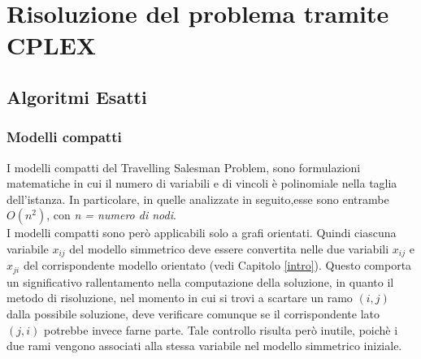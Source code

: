 \chapter{Risoluzione del problema tramite CPLEX}\label{CPLEX} 
\section{Algoritmi Esatti}
\subsection{Modelli compatti}
I modelli compatti del Travelling Salesman Problem, sono formulazioni matematiche in cui il numero di variabili e di vincoli è polinomiale nella taglia dell'istanza. In particolare, in quelle analizzate in seguito,esse sono entrambe $O(n^2)$, con \textit{n = numero di nodi}.\\
I modelli compatti sono però applicabili solo a grafi orientati. Quindi ciascuna variabile $x_{ij}$ del modello simmetrico deve essere convertita nelle due variabili $x_{ij}$ e $x_{ji}$ del corrispondente modello orientato (vedi Capitolo \ref{intro}). Questo comporta un significativo rallentamento nella computazione della soluzione, in quanto il metodo di risoluzione, nel momento in cui si trovi a scartare un ramo $(i,j)$ dalla possibile soluzione, deve verificare comunque se il corrispondente lato $(j,i)$ potrebbe invece farne parte. Tale controllo risulta però inutile, poichè i due rami vengono associati alla stessa variabile nel modello simmetrico iniziale.
